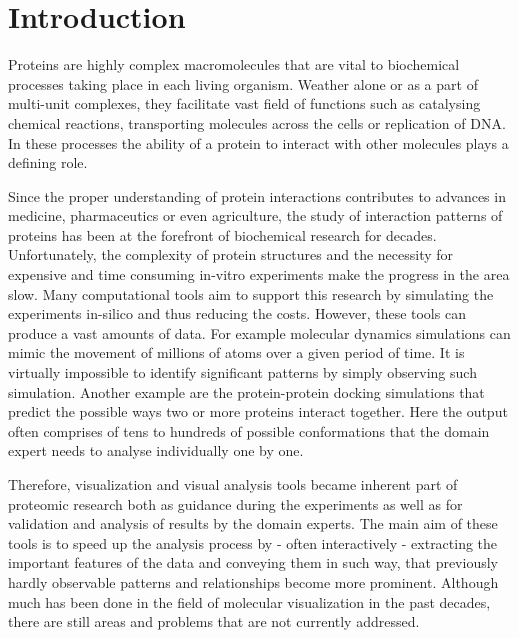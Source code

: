 \chapter{Introduction}
\label{Sec:Intro}
Proteins are highly complex macromolecules that are vital to biochemical processes taking place in each living organism. Weather alone or as a part of multi-unit complexes, they facilitate vast field of functions such as catalysing chemical reactions, transporting molecules across the cells or replication of DNA. In these processes the ability of a protein to interact with other molecules plays a defining role. 

Since the proper understanding of protein interactions contributes to advances in medicine, pharmaceutics or even agriculture, the study of interaction patterns of proteins has been at the forefront of biochemical research for decades. Unfortunately, the complexity of protein structures and the necessity for expensive and time consuming in-vitro experiments make the progress in the area slow. Many computational tools aim to support this research by simulating the experiments in-silico and thus reducing the costs. However, these tools can produce a vast amounts of data. For example molecular dynamics simulations can mimic the movement of millions of atoms over a given period of time. It is virtually impossible to identify significant patterns by simply observing such simulation. Another example are the protein-protein docking simulations that predict the possible ways two or more proteins interact together. Here the output often comprises of tens to hundreds of possible conformations that the domain expert needs to analyse individually one by one.

Therefore, visualization and visual analysis tools became inherent part of proteomic research both as guidance during the experiments as well as for validation and analysis of results by the domain experts.  The main aim of these tools is to speed up the analysis process by - often interactively - extracting the important features of the data and conveying them in such way, that previously hardly observable patterns and relationships become more prominent. Although much has been done in the field of molecular visualization in the past decades, there are still areas and problems that are not currently addressed. 


